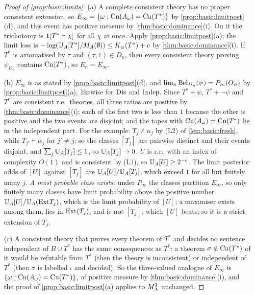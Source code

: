 \begin{proof}[Proof of \cref{prop:basic:limits}]
(a) A complete consistent theory has no proper consistent extension, so $E_\infty=\{\omega:\mathrm{Cn}(A_\omega)=\mathrm{Cn}(T^*)\}$ by \cref{prop:basic:limitpost}(d), and this event has positive measure by \cref{thm:basic:dominance}(i). On it the trichotomy is $\mathbf{1}[T^*\vdash\chi]$ for all $\chi$ at once. Apply \cref{prop:basic:limitpost}(a); the limit loss is $-\log(\mathbb{U}_{A}[T^*]/M_{A}(\emptyset))\le K_{\equiv}(T^*)+c$ by \cref{thm:basic:dominance}(i). If $T^*$ is axiomatised by $\tau$ and $(\tau,1)\in D_n$, then every consistent theory proving $\psi_{D_n}$ contains $\mathrm{Cn}(T^*)$, so $E_n=E_\infty$.

(b) $E_\infty$ is as stated by \cref{prop:basic:limitpost}(d), and $\lim_n\mathrm{Bel}_{D_n}(\psi)=P_\infty(O_\psi)$ by \cref{prop:basic:limitpost}(a), likewise for $\mathrm{Dis}$ and $\mathrm{Indep}$. Since $T^*+\psi$, $T^*+\neg\psi$ and $T^*$ are consistent r.e.\ theories, all three ratios are positive by \cref{thm:basic:dominance}(i); each of the first two is less than $1$ because the other is positive and the two events are disjoint; and the tapes with $\mathrm{Cn}(A_\omega)=\mathrm{Cn}(T^*)$ lie in the independent part. For the example: $T_j\nvdash\alpha_j$ by (L2) of \cref{lem:basic:fresh}, while $T_{j'}\vdash\alpha_j$ for $j'\ne j$; so the classes $[T_j]$ are pairwise distinct and their events disjoint, and $\sum_j\mathbb{U}_{A}[T_j]\le1$, so $\mathbb{U}_{A}[T_j]\to0$. $U$ is r.e.\ with an index of complexity $O(1)$ and is consistent by (L1), so $\mathbb{U}_{A}[U]\ge2^{-c}$. The limit posterior odds of $[U]$ against $[T_j]$ are $\mathbb{U}_{A}[U]/\mathbb{U}_{A}[T_j]$, which exceed $1$ for all but finitely many $j$. \emph{A most probable class exists:} under $P_\infty$ the classes partition $E_\infty$, so only finitely many classes have limit probability above the positive number $\mathbb{U}_{A}[U]/\mathbb{U}_{A}(\mathrm{Ext} T_j)$, which is the limit probability of $[U]$; a maximiser exists among them, lies in $\mathrm{Ext}(T_j)$, and is not $[T_j]$, which $[U]$ beats; so it is a strict extension of $T_j$.

(c) A consistent theory that proves every theorem of $T^*$ and decides no sentence independent of $B\cup T^*$ has the same consequences as $T^*$: a theorem $\sigma\notin\mathrm{Cn}(T^*)$ of it would be refutable from $T^*$ (then the theory is inconsistent) or independent of $T^*$ (then $\sigma$ is labelled $\iota$ and decided). So the three-valued analogue of $E_\infty$ is $\{\omega:\mathrm{Cn}(A_\omega)=\mathrm{Cn}(T^*)\}$, of positive measure by \cref{thm:basic:dominance}(i), and the proof of \cref{prop:basic:limitpost}(a) applies to $M_{A}^{3}$ unchanged.
\end{proof}

